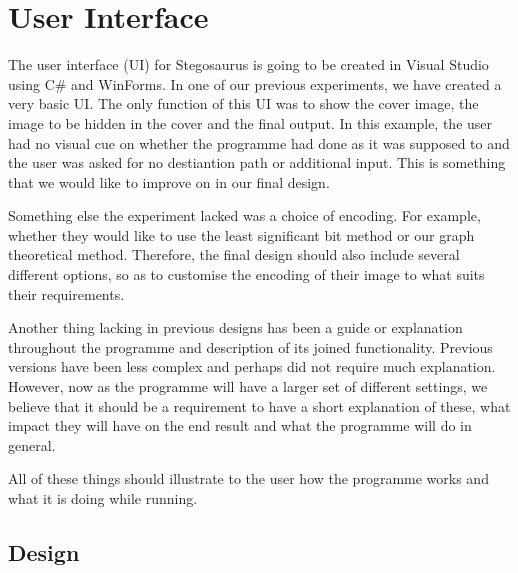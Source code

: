 \section{User Interface}
\label{sec:designUI}

The user interface (UI) for Stegosaurus is going to be created in Visual Studio using C\# and WinForms.
In one of our previous experiments, we have created a very basic UI.
The only function of this UI was to show the cover image, the image to be hidden in the cover and the final output.
In this example, the user had no visual cue on whether the programme had done as it was supposed to and the user was asked for no destiantion path or additional input.
This is something that we would like to improve on in our final design.

Something else the experiment lacked was a choice of encoding.
For example, whether they would like to use the least significant bit method or our graph theoretical method.
Therefore, the final design should also include several different options, so as to customise the encoding of their image to what suits their requirements.

Another thing lacking in previous designs has been a guide or explanation throughout the programme and description of its joined functionality.
Previous versions have been less complex and perhaps did not require much explanation.
However, now as the programme will have a larger set of different settings, we believe that it should be a requirement to have a short explanation of these, what impact they will have on the end result and what the programme will do in general.

All of these things should illustrate to the user how the programme works and what it is doing while running.

\subsection{Design}

